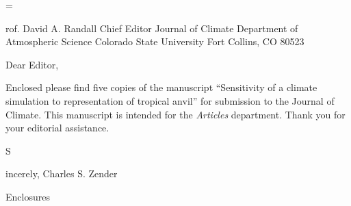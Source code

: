 

\magnification=

\addressdefine
\formalletterhead

\address
Prof. David A. Randall
Chief Editor
Journal of Climate
Department of Atmospheric Science
Colorado State University
Fort Collins, CO 80523

\body
Dear Editor,

Enclosed please find five copies of the manuscript ``Sensitivity of a
climate simulation to representation of tropical anvil'' for
submission to the Journal of Climate.  
This manuscript is intended for the {\it Articles} department.
Thank you for your editorial assistance.

\closing 
Sincerely,
Charles S. Zender

\annotations %
Enclosures


\endletter %
\bye %

